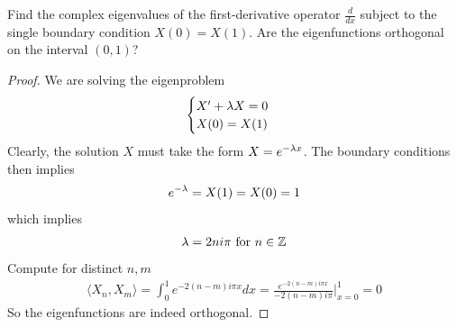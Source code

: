 \documentclass{report}
\begin{document}
\begin{question}{}{}
Find the complex eigenvalues of the first-derivative operator $\frac{d}{dx}$ subject to the single boundary condition $X(0)=X(1)$. Are the eigenfunctions orthogonal on the interval $(0,1)$? 
\end{question}
\begin{proof}
We are solving the eigenproblem 
\begin{align*}
\begin{cases}
  X'+ \lambda X=0 \\
  X(0)=X(1)
\end{cases}
\end{align*}
Clearly, the solution $X$ must take the form  $X=e^{-\lambda x}$. The boundary conditions then implies 
\begin{align*}
e^{-\lambda }=X(1)=X(0)=1
\end{align*}
which implies 
\begin{align*}
\lambda = 2n i \pi \text{ for }n\in\mathbb{Z}
\end{align*}
Compute for distinct $n,m$ 
\begin{align*}
\langle X_n,X_m\rangle = \int_0^1 e^{- 2(n-m) i \pi  x}dx= \frac{e^{-2(n-m)i \pi  x}}{-2(n-m)i \pi }\Big|_{x=0}^1= 0
\end{align*}
So the eigenfunctions are indeed orthogonal. 
\end{proof}
\end{document}
